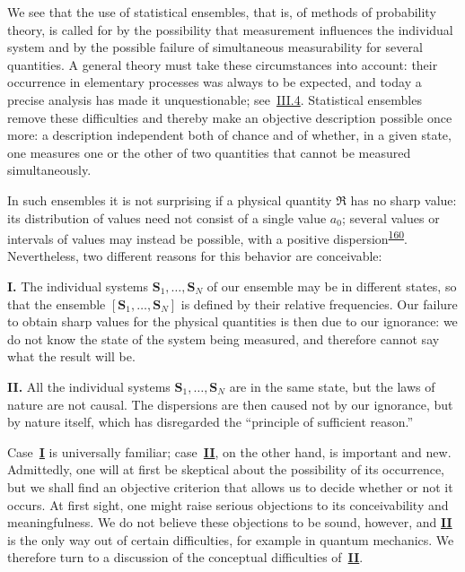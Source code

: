 \documentclass[fontsize=13pt,twoside,openany,headings=normal,parskip=false,bookmarkpackage=false,DIV=calc]{scrbook}
\begin{document}
We see that the use of statistical ensembles, that is, of methods of probability theory, is called for by the possibility that measurement influences the individual system and by the possible failure of simultaneous measurability for several quantities. A general theory must take these circumstances into account: their occurrence in elementary processes was always to be expected, and today a precise analysis has made it unquestionable; see~\hyperref[sec:III.4]{III.4}. Statistical ensembles remove these difficulties
\hypertarget{origpage-160}{}%
and thereby make an objective description possible once more: a description independent both of chance and of whether, in a given state, one measures one or the other of two quantities that cannot be measured simultaneously.

In such ensembles it is not surprising if a physical quantity $\mathfrak R$ has no sharp value: its distribution of values need not consist of a single value $a_0$; several values or intervals of values may instead be possible, with a positive dispersion\textsuperscript{\hyperlink{note-160}{160}}. Nevertheless, two different reasons for this behavior are conceivable:

\leavevmode{}\textbf{I.}\label{case:IV.1.I} The individual systems $\boldsymbol{S}_1,\ldots,\boldsymbol{S}_N$ of our ensemble may be in different states, so that the ensemble $[\boldsymbol{S}_1,\ldots,\boldsymbol{S}_N]$ is defined by their relative frequencies. Our failure to obtain sharp values for the physical quantities is then due to our ignorance: we do not know the state of the system being measured, and therefore cannot say what the result will be.

\leavevmode{}\textbf{II.}\label{case:IV.1.II} All the individual systems $\boldsymbol{S}_1,\ldots,\boldsymbol{S}_N$ are in the same state, but the laws of nature are not causal. The dispersions are then caused not by our ignorance, but by nature itself, which has disregarded the ``principle of sufficient reason.''

Case~\hyperref[case:IV.1.I]{\textbf{I}} is universally familiar; case~\hyperref[case:IV.1.II]{\textbf{II}}, on the other hand, is important and new. Admittedly, one will at first be skeptical about the possibility of its occurrence, but we shall find an objective criterion that allows us to decide whether or not it occurs. At first sight, one might raise serious objections to its conceivability and meaningfulness. We do not believe these objections to be sound, however, and \hyperref[case:IV.1.II]{\textbf{II}} is the only way out of certain difficulties, for example in quantum mechanics. We therefore turn to a discussion of the conceptual difficulties of~\hyperref[case:IV.1.II]{\textbf{II}}.
\end{document}
